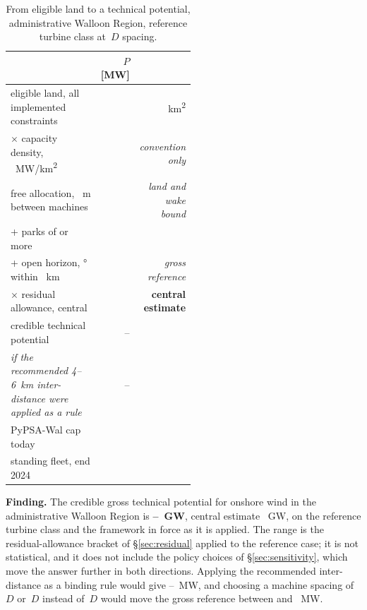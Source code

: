 \documentclass[11pt,a4paper]{article}
\newcommand{\finding}[1]{\par\medskip\noindent\colorbox{wal!10}{%
  \begin{minipage}{\dimexpr\linewidth-2\fboxsep}\textbf{Finding.} #1\end{minipage}}\par\medskip}
\begin{document}
\begin{table}[htbp]\centering\small
\caption{From eligible land to a technical potential, administrative Walloon
Region, reference turbine class at \PlaceRotorD{}\,$D$ spacing.}
\label{tab:answer}
\begin{tabular}{p{0.52\linewidth}rr}
\toprule
 & $P$ [\si{\mega\watt}] & \\
\midrule
eligible land, all implemented constraints
  & \multicolumn{2}{r}{\AdminEligible{}~\si{\square\kilo\metre}} \\
$\times$ capacity density, {}~MW/\si{\square\kilo\metre}
  & \AdminPnom{} & \emph{convention only} \\
free allocation, \PlaceSpacing{}~m between machines
  & \FreePnom{} & \emph{land and wake bound} \\
+ parks of \PlaceMinTurbines{} or more
  & \NoHorizonPnom{} & \\
+ open horizon, \PlaceAzimuth{}° within \PlaceHorizonRadius{}~km
  & \PlacePnom{} & \emph{gross reference} \\
$\times$ residual allowance, central
  & \ResCentral{} & \textbf{central estimate} \\
\midrule
credible technical potential
  & \CredibleLow{}--\CredibleHigh{} & \\
\emph{if the recommended 4--6~km inter-distance were applied as a rule}
  & \InterdistLow{}--\InterdistHigh{} & \\
\midrule
PyPSA-Wal cap today & \CapToday{} & \\
standing fleet, end 2024 & \Installed{} & \\
\bottomrule
\end{tabular}
\end{table}

\finding{The credible gross technical potential for onshore wind in the
administrative Walloon Region is
\textbf{\CredibleLowGW{}--\CredibleHighGW{}~GW}, central estimate
\CredibleCentralGW{}~GW, on the reference turbine class and the framework in
force as it is applied. The range is the residual-allowance bracket of
§\ref{sec:residual} applied to the reference case; it is not statistical, and
it does not include the policy choices of §\ref{sec:sensitivity}, which move the
answer further in both directions. Applying the recommended inter-distance as a
binding rule would give \InterdistLow{}--\InterdistHigh{}~MW, and choosing a
machine spacing of \SpObsD{}\,$D$ or \SpIsoD{}\,$D$ instead of \SpCrossD{}\,$D$
would move the gross reference between \SpObsMW{} and \SpIsoMW{}~MW.}
\end{document}

